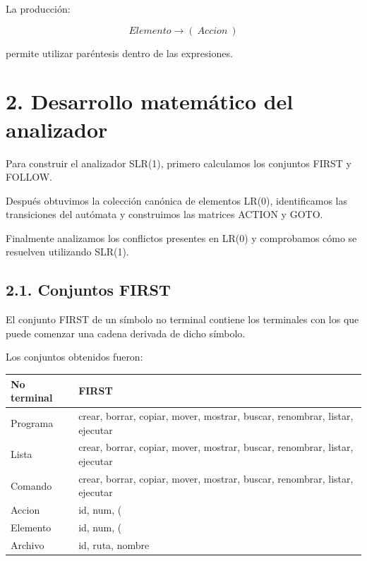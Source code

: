 \documentclass[11pt,letterpaper]{article}
\begin{document}
La producción:

\[
Elemento \rightarrow (\ Accion\ )
\]

permite utilizar paréntesis dentro de las expresiones.


\section*{2. Desarrollo matemático del analizador}

Para construir el analizador SLR(1), primero calculamos
los conjuntos FIRST y FOLLOW.

Después obtuvimos la colección canónica de elementos
LR(0), identificamos las transiciones del autómata y
construimos las matrices ACTION y GOTO.

Finalmente analizamos los conflictos presentes en LR(0)
y comprobamos cómo se resuelven utilizando SLR(1).


\subsection*{2.1. Conjuntos FIRST}

El conjunto FIRST de un símbolo no terminal contiene
los terminales con los que puede comenzar una cadena
derivada de dicho símbolo.

Los conjuntos obtenidos fueron:

\begin{center}
\begin{tabular}{|l|p{10cm}|}
\hline
\textbf{No terminal} & \textbf{FIRST} \\ \hline
Programa &
crear, borrar, copiar, mover, mostrar,
buscar, renombrar, listar, ejecutar \\ \hline
Lista &
crear, borrar, copiar, mover, mostrar,
buscar, renombrar, listar, ejecutar \\ \hline
Comando &
crear, borrar, copiar, mover, mostrar,
buscar, renombrar, listar, ejecutar \\ \hline
Accion & id, num, ( \\ \hline
Elemento & id, num, ( \\ \hline
Archivo & id, ruta, nombre \\ \hline
\end{tabular}
\end{center}
\end{document}

